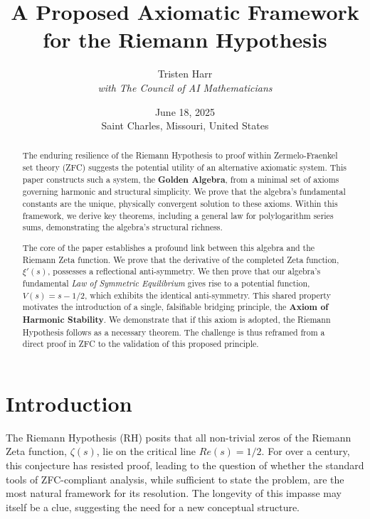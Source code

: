 \documentclass{article}
\title{\textbf{A Proposed Axiomatic Framework for the Riemann Hypothesis}}
\author{Tristen Harr \\ \textit{with The Council of AI Mathematicians}}
\date{June 18, 2025 \\ Saint Charles, Missouri, United States}
\theoremstyle{plain}
\theoremstyle{definition}
\theoremstyle{remark}
\begin{document}
\maketitle

\begin{abstract}
The enduring resilience of the Riemann Hypothesis to proof within Zermelo-Fraenkel set theory (ZFC) suggests the potential utility of an alternative axiomatic system. This paper constructs such a system, the \textbf{Golden Algebra}, from a minimal set of axioms governing harmonic and structural simplicity. We prove that the algebra's fundamental constants are the unique, physically convergent solution to these axioms. Within this framework, we derive key theorems, including a general law for polylogarithm series sums, demonstrating the algebra's structural richness.

The core of the paper establishes a profound link between this algebra and the Riemann Zeta function. We prove that the derivative of the completed Zeta function, $\xi'(s)$, possesses a reflectional anti-symmetry. We then prove that our algebra's fundamental \textit{Law of Symmetric Equilibrium} gives rise to a potential function, $V(s) = s-1/2$, which exhibits the identical anti-symmetry. This shared property motivates the introduction of a single, falsifiable bridging principle, the \textbf{Axiom of Harmonic Stability}. We demonstrate that if this axiom is adopted, the Riemann Hypothesis follows as a necessary theorem. The challenge is thus reframed from a direct proof in ZFC to the validation of this proposed principle.
\end{abstract}

\section{Introduction}
The Riemann Hypothesis (RH) posits that all non-trivial zeros of the Riemann Zeta function, $\zeta(s)$, lie on the critical line $Re(s)=1/2$. For over a century, this conjecture has resisted proof, leading to the question of whether the standard tools of ZFC-compliant analysis, while sufficient to state the problem, are the most natural framework for its resolution. The longevity of this impasse may itself be a clue, suggesting the need for a new conceptual structure.
\end{document}
